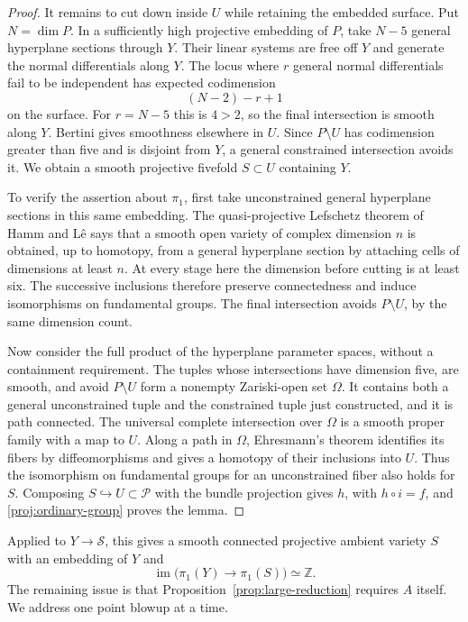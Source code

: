 \documentclass[11pt,reqno]{amsart}
\numberwithin{equation}{section}
\theoremstyle{definition}
\theoremstyle{remark}
\newcommand{\Z}{\mathbb Z}
\newcommand{\cS}{\mathcal S}
\DeclareMathOperator{\im}{im}
\begin{document}
\begin{proof}
It remains to cut down inside $U$ while retaining the embedded surface.
Put $N=\dim P$.  In a sufficiently high projective embedding of $P$,
take $N-5$ general hyperplane sections through $Y$.  Their linear systems
are free off $Y$ and generate the normal differentials along $Y$.
The locus where $r$ general normal differentials fail to be independent
has expected codimension
\begin{equation}\label{proj:rank-loss}
 (N-2)-r+1
\end{equation}
on the surface.  For $r=N-5$ this is $4>2$, so the final intersection
is smooth along $Y$.  Bertini gives smoothness elsewhere in $U$.
Since $P\setminus U$ has codimension greater than five and is disjoint
from $Y$, a general constrained intersection avoids it.  We obtain a
smooth projective fivefold $S\subset U$ containing $Y$.

To verify the assertion about $\pi_1$, first take unconstrained general
hyperplane sections in this same embedding.  The quasi-projective
Lefschetz theorem of Hamm and L\^e
\cite[Theorem~1.1.3(ii)]{HammLe} says that a smooth open variety of
complex dimension $n$ is obtained, up to homotopy, from a general
hyperplane section by attaching cells of dimensions at least $n$.
At every stage here the dimension before cutting is at least six.
The successive inclusions therefore preserve connectedness and induce
isomorphisms on fundamental groups.  The final intersection avoids
$P\setminus U$, by the same dimension count.

Now consider the full product of the hyperplane parameter spaces,
without a containment requirement.  The tuples whose intersections
have dimension five, are smooth, and avoid $P\setminus U$ form a
nonempty Zariski-open set $\Omega$.  It contains both a general
unconstrained tuple and the constrained tuple just constructed, and it
is path connected.  The universal complete intersection over $\Omega$
is a smooth proper family with a map to $U$.  Along a path in $\Omega$,
Ehresmann's theorem identifies its fibers by diffeomorphisms and gives
a homotopy of their inclusions into $U$.  Thus the isomorphism on
fundamental groups for an unconstrained fiber also holds for $S$.
Composing $S\hookrightarrow U\subset\mathcal P$ with the bundle
projection gives $h$, with $h\circ i=f$, and
\eqref{proj:ordinary-group} proves the lemma.
\end{proof}

Applied to $Y\to\cS$, this gives a smooth connected projective ambient
variety $S$ with an embedding of $Y$ and
\begin{equation}\label{proj:blownup-image}
 \im\bigl(\pi_1(Y)\longrightarrow\pi_1(S)\bigr)\simeq\Z.
\end{equation}
The remaining issue is that Proposition~\ref{prop:large-reduction}
requires $A$ itself.  We address one point blowup at a time.
\end{document}
